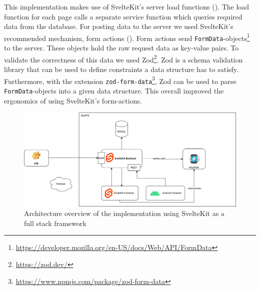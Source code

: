 This implementation makes use of SvelteKit's server load functions (). The load function for each page calls a separate service function which queries required data from the database. For posting data to the server we used SvelteKit's recommended mechanism, form actions (). Form actions send \texttt{FormData}-objects\footnote{\url{https://developer.mozilla.org/en-US/docs/Web/API/FormData}} to the server. These objects hold the raw request data as key-value pairs. To validate the correctness of this data we used Zod\footnote{\url{https://zod.dev/}}. Zod is a schema validation library that can be used to define constraints a data structure has to satisfy. Furthermore, with the extension \texttt{zod-form-data}\footnote{\url{https://www.npmjs.com/package/zod-form-data}}, Zod can be used to parse \texttt{FormData}-objects into a given data structure. This overall improved the ergonomics of using SvelteKit's form-actions.  


\begin{figure}
    \centering
    \includegraphics[width=.8\linewidth]{assets/dswfd-architecture-fullstack}
    \caption{Architecture overview of the implementation using SvelteKit as a full stack framework}
    \label{fig:dswfd-architecture-fullstack}
\end{figure}

